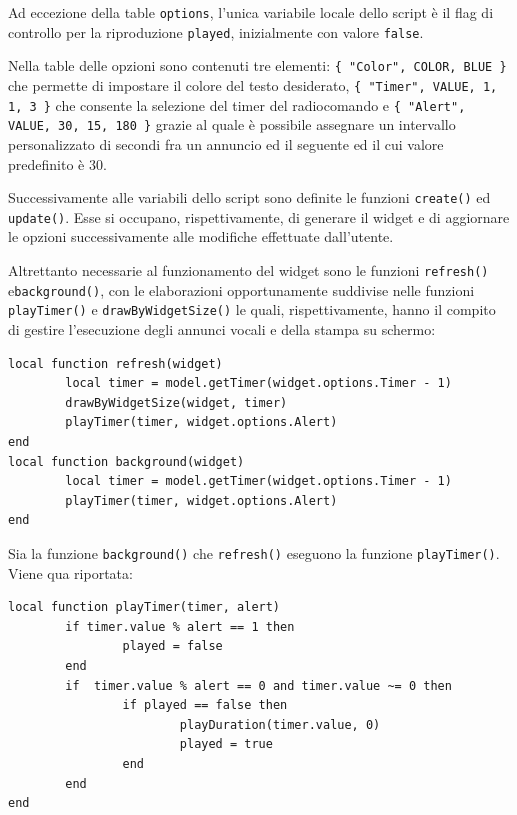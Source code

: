 \documentclass[a4paper, 12pt]{report} %
\begin{document}
Ad eccezione della table \texttt{options}, l'unica variabile locale dello script è il flag di controllo per la riproduzione \texttt{played}, inizialmente con valore \texttt{false}.

Nella table delle opzioni sono contenuti tre elementi: \texttt{\{ "Color", COLOR, BLUE \}} che permette di impostare il colore del testo desiderato, \texttt{\{ "Timer", VALUE, 1, 1, 3 \}} che consente la selezione del timer del radiocomando e \texttt{\{ "Alert", VALUE, 30, 15, 180 \}} grazie al quale è possibile assegnare un intervallo personalizzato di secondi fra un annuncio ed il seguente ed il cui valore predefinito è $30$.

Successivamente alle variabili dello script sono definite le funzioni \texttt{create()} ed \texttt{update()}. Esse si occupano, rispettivamente, di generare il widget e di aggiornare le opzioni successivamente alle modifiche effettuate dall'utente.

Altrettanto necessarie al funzionamento del widget sono le funzioni \texttt{refresh()} e\newline \texttt{background()}, con le elaborazioni opportunamente suddivise nelle funzioni \texttt{playTimer()} e \texttt{drawByWidgetSize()} le quali, rispettivamente, hanno il compito di gestire l'esecuzione degli annunci vocali e della stampa su schermo:

\begin{lstlisting}
local function refresh(widget)
        local timer = model.getTimer(widget.options.Timer - 1)
        drawByWidgetSize(widget, timer)
        playTimer(timer, widget.options.Alert)
end
local function background(widget)
        local timer = model.getTimer(widget.options.Timer - 1)
        playTimer(timer, widget.options.Alert)
end
\end{lstlisting}

Sia la funzione \texttt{background()} che \texttt{refresh()} eseguono la funzione \texttt{playTimer()}. Viene qua riportata:

\begin{lstlisting}
local function playTimer(timer, alert)
        if timer.value % alert == 1 then
                played = false
        end
        if  timer.value % alert == 0 and timer.value ~= 0 then
                if played == false then
                        playDuration(timer.value, 0)
                        played = true
                end
        end
end 
\end{lstlisting}
\end{document}
